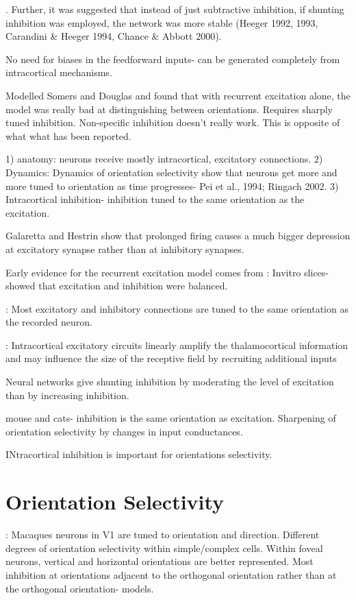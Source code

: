 \documentclass {report}
\begin{document}
\cite{Somers1995, Douglas1995}. Further, it was suggested that instead of just subtractive inhibition, if shunting inhibition was employed, the network was more stable (Heeger 1992, 1993, Carandini \& Heeger 1994, Chance \& Abbott 2000).

\cite{Adorjan1999} No need for biases in the feedforward inputs- can be generated completely from intracortical mechanisms.

\cite{Carandini1997} Modelled Somers and Douglas and found that with recurrent excitation alone, the model was really bad at distinguishing between orientations. Requires sharply tuned inhibition. Non-specific inhibition doesn't really work. This is opposite of what what has been reported. 


1) anatomy: neurons receive mostly intracortical, excitatory connections. 
2) Dynamics: Dynamics of orientation selectivity show that neurons get more and more tuned to orientation as time progresses- Pei et al., 1994; Ringach 2002. 
3) Intracortical inhibition- inhibition tuned to the same orientation as the excitation.

\cite{Nelson1998} Galaretta and Hestrin show that prolonged firing causes a much bigger depression at excitatory synapse rather than at inhibitory synapses.

Early evidence for the recurrent excitation model comes from 
\cite{Shu2003}: Invitro slices- showed that excitation and inhibition were balanced. 

\cite{Monier2003}: Most excitatory and inhibitory connections are tuned to the same orientation as the recorded neuron.

\cite{Li2013}: Intracortical excitatory circuits linearly amplify the thalamocortical information and may influence the size of the receptive field by recruiting additional inputs

\cite{Sato2016} Neural networks give shunting inhibition by moderating the level of excitation than by increasing inhibition.

\cite{Tan2011a} mouse and cats- inhibition is the same orientation as excitation. Sharpening of orientation selectivity by changes in input conductances.

\cite{Shapley2007} INtracortical inhibition is important for orientations selectivity.
\section*{Orientation Selectivity}
\cite{DeValois1982}: Macaques neurons in V1 are tuned to orientation and direction. Different degrees of orientation selectivity within simple/complex cells. Within foveal neurons, vertical and horizontal orientations are better represented. Most inhibition at orientations adjacent to the orthogonal orientation rather than at the orthogonal orientation- models.
\end{document}
